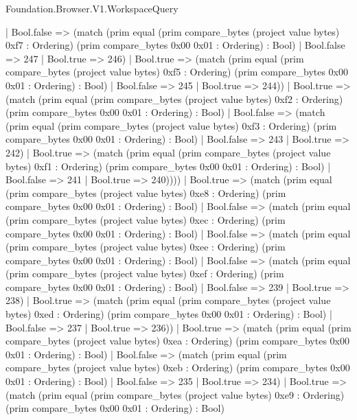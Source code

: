 \begin{lexlean}{Foundation.Browser.V1.WorkspaceQuery}
\begin{semanticmodule}
{                  | Bool.false => (match (prim equal (prim compare_bytes (project value bytes) 0xf7 : Ordering) (prim compare_bytes 0x00 0x01 : Ordering) : Bool)
                    | Bool.false => 247
                    | Bool.true => 246)
                  | Bool.true => (match (prim equal (prim compare_bytes (project value bytes) 0xf5 : Ordering) (prim compare_bytes 0x00 0x01 : Ordering) : Bool)
                    | Bool.false => 245
                    | Bool.true => 244))
                | Bool.true => (match (prim equal (prim compare_bytes (project value bytes) 0xf2 : Ordering) (prim compare_bytes 0x00 0x01 : Ordering) : Bool)
                  | Bool.false => (match (prim equal (prim compare_bytes (project value bytes) 0xf3 : Ordering) (prim compare_bytes 0x00 0x01 : Ordering) : Bool)
                    | Bool.false => 243
                    | Bool.true => 242)
                  | Bool.true => (match (prim equal (prim compare_bytes (project value bytes) 0xf1 : Ordering) (prim compare_bytes 0x00 0x01 : Ordering) : Bool)
                    | Bool.false => 241
                    | Bool.true => 240))))
            | Bool.true => (match (prim equal (prim compare_bytes (project value bytes) 0xe8 : Ordering) (prim compare_bytes 0x00 0x01 : Ordering) : Bool)
              | Bool.false => (match (prim equal (prim compare_bytes (project value bytes) 0xec : Ordering) (prim compare_bytes 0x00 0x01 : Ordering) : Bool)
                | Bool.false => (match (prim equal (prim compare_bytes (project value bytes) 0xee : Ordering) (prim compare_bytes 0x00 0x01 : Ordering) : Bool)
                  | Bool.false => (match (prim equal (prim compare_bytes (project value bytes) 0xef : Ordering) (prim compare_bytes 0x00 0x01 : Ordering) : Bool)
                    | Bool.false => 239
                    | Bool.true => 238)
                  | Bool.true => (match (prim equal (prim compare_bytes (project value bytes) 0xed : Ordering) (prim compare_bytes 0x00 0x01 : Ordering) : Bool)
                    | Bool.false => 237
                    | Bool.true => 236))
                | Bool.true => (match (prim equal (prim compare_bytes (project value bytes) 0xea : Ordering) (prim compare_bytes 0x00 0x01 : Ordering) : Bool)
                  | Bool.false => (match (prim equal (prim compare_bytes (project value bytes) 0xeb : Ordering) (prim compare_bytes 0x00 0x01 : Ordering) : Bool)
                    | Bool.false => 235
                    | Bool.true => 234)
                  | Bool.true => (match (prim equal (prim compare_bytes (project value bytes) 0xe9 : Ordering) (prim compare_bytes 0x00 0x01 : Ordering) : Bool)
}
\end{semanticmodule}
\end{lexlean}
